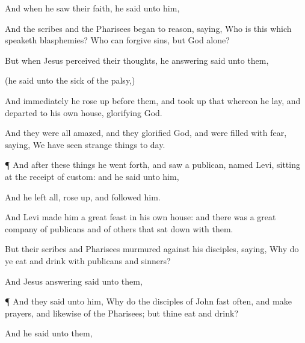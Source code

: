 {And when he
saw
their
faith, he
said unto
him,
{}

And the
scribes
and the
Pharisees
began to
reason,
saying,
Who
is
this
which
speaketh
blasphemies?
Who
can
forgive
sins,
but
God
alone?

But
when
Jesus
perceived
their
thoughts, he
answering
said
unto
them,
{}


 (he
said unto the sick of the
palsy,)
{}

And
immediately he rose
up
before
them, and
took
up
that whereon he
lay, and
departed
to his
own
house,
glorifying
God.

And they
were
all
amazed,
and they
glorified
God,
and were
filled with
fear,
saying, We have
seen strange
things to
day.


\par }{\PP {}¶
And
after these
things he went
forth,
and
saw a
publican,
named
Levi,
sitting
at the receipt of
custom:
and he
said unto
him,
{}

And he
left
all, rose
up, and
followed
him.

And
Levi
made
him a
great
feast
in his
own
house:
and there
was a
great
company of
publicans
and of
others
that sat
down
with
them.

But
their
scribes
and
Pharisees
murmured
against
his
disciples,
saying,
Why do ye
eat
and
drink
with
publicans
and
sinners?

And
Jesus
answering
said
unto
them,
{}



\par }{\PP {}¶ And they
said
unto
him, Why
do the
disciples of
John
fast
often,
and
make
prayers,
and
likewise
{} of the
Pharisees;
but
thine
eat
and
drink?

And he
said
unto
them,
{}



}
